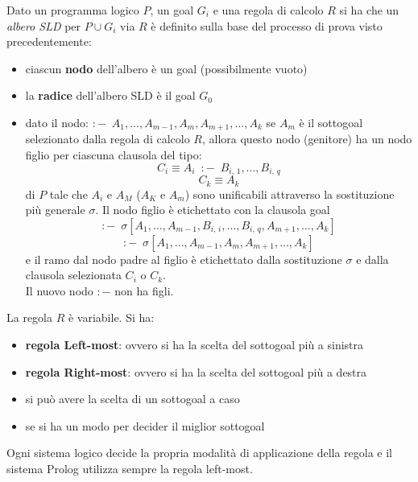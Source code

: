 \documentclass[a4paper]{report}
\begin{document}
\begin{itemize}
Dato un programma logico $P$, un goal $G_i$ e una regola di calcolo $R$ si ha che un \textit{albero SLD} per $P\cup G_i$ via $R$
è definito sulla base del processo di prova visto precedentemente:
\begin{itemize}
\item ciascun \textbf{nodo} dell'albero è un goal (possibilmente vuoto)
\item la \textbf{radice }dell'albero SLD è il goal $G_0$
\item dato il nodo: $:-\,\,\, A_1,...,A_{m-1},A_m,A_{m+1},...,A_k$
  se $A_m$ è il sottogoal selezionato dalla regola di calcolo $R$, allora questo nodo (genitore) ha un nodo figlio
  per ciascuna clausola del tipo:
$$C_i\equiv A_i\,\,\, :-\,\,\, B_{i,\,1},...,B_{i,\,q}$$
$$C_k\equiv A_k$$
di $P$ tale che $A_i$ e $A_M$ ($A_K$ e $A_m$) sono unificabili attraverso la sostituzione più generale $\sigma$.\newline
Il nodo figlio è etichettato con la clausola goal
$$:-\,\,\,\sigma[A_1,...,A_{m-1},B_{i,\,i},...,B_{i,\,q},A_{m+1},...,A_k]$$
$$:-\,\,\,\sigma[A_1,...,A_{m-1},A_m,A_{m+1},...,A_k]$$
e il ramo dal nodo padre al figlio è etichettato dalla sostituzione $\sigma$ e dalla clausola selezionata $C_i$ o $C_k$.\\
Il nuovo nodo $:-$ non ha figli.
\end{itemize}
La regola $R$ è variabile. Si ha:
\begin{itemize}
\item \textbf{regola Left-most}: ovvero si ha la scelta del sottogoal più a sinistra 
\item \textbf{regola Right-most}: ovvero si ha la scelta del sottogoal più a destra
\item si può avere la scelta di un sottogoal a caso
\item se si ha un modo per decider il miglior sottogoal  
\end{itemize}
Ogni sistema logico decide la propria modalità di applicazione della regola e il sistema Prolog utilizza sempre la regola left-most.


\end{itemize}
\end{document}
